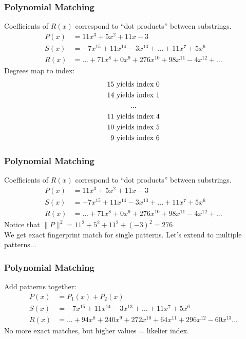 \documentclass[
	11pt, %
]{beamer}
\begin{document}

\begin{frame}
    \frametitle{Polynomial Matching}
    Coefficients of $R(x)$ correspond to ``dot products'' between substrings.
    \begin{align*}
        P(x) & = 11x^3 + 5x^2 + 11x - 3                                    \\
        S(x) & = -7x^{15} + 11x^{14} - 3x^{13} + ... + 11x^7 + 5x^6        \\
        R(x) & = ... + 71x^8 + 0x^9 + 276x^{10} + 98x^{11} - 4x^{12} + ...
    \end{align*}
    Degrees map to index:
    \begin{align*}
        15 & \text{ yields index } 0 \\
        14 & \text{ yields index } 1 \\
           & \hspace{0.8cm}...       \\
        11 & \text{ yields index } 4 \\
        10 & \text{ yields index } 5 \\
        9  & \text{ yields index } 6 \\
    \end{align*}
\end{frame}


\begin{frame}
    \frametitle{Polynomial Matching}
    Coefficients of $R(x)$ correspond to ``dot products'' between substrings.
    \begin{align*}
        P(x) & = 11x^3 + 5x^2 + 11x - 3                                    \\
        S(x) & = -7x^{15} + 11x^{14} - 3x^{13} + ... + 11x^7 + 5x^6        \\
        R(x) & = ... + 71x^8 + 0x^9 + 276x^{10} + 98x^{11} - 4x^{12} + ...
    \end{align*}
    Notice that $\|P\|^2 = 11^2 + 5^2 + 11^2 + (-3)^2 = 276$ \\
    \bigskip
    We get exact fingerprint match for single patterns. Let's extend to multiple patterns...
\end{frame}



\begin{frame}
    \frametitle{Polynomial Matching}
    Add patterns together:
    \begin{align*}
        P(x) & = P_1(x) + P_2(x)                                                        \\
        S(x) & = -7x^{15} + 11x^{14} - 3x^{13} + ... + 11x^7 + 5x^6                     \\
        R(x) & = ... + 94x^8 + 240x^9 + 272x^{10} + 64x^{11} + 296x^{12} - 60x^{13} ...
    \end{align*}
    \bigskip
    No more exact matches, but higher values = likelier index.
\end{frame}
\end{document}
